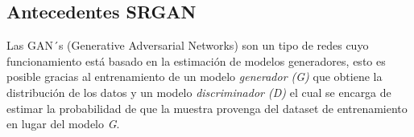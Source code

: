 \subsection{Antecedentes SRGAN}



Las GAN´s (Generative Adversarial Networks) son un tipo de redes cuyo funcionamiento está basado
en la estimación de modelos generadores, esto es posible gracias al entrenamiento de un modelo 
\emph{generador (G)} que obtiene la distribución de los datos y un modelo \emph{discriminador (D)} 
el cual se encarga de estimar la probabilidad de que la muestra provenga del dataset de entrenamiento en lugar
del modelo \emph{G}.\cite{GANs}